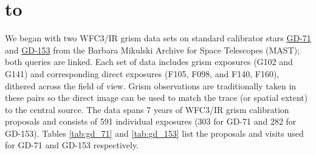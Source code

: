 \documentclass[12pt]{article}
\def\ssectionstar#1{\section*{\hbox to \hsize{\large\bf #1\hfill}}}
\begin{document}
{\ssectionstar{Data}
\normalsize{

    We began with two WFC3/IR grism data sets on standard calibrator stars
    \href{http://archive.stsci.edu/hst/search.php?action=Search&sci_instrume=WFC3&sci_targname=GD-71&sci_pep_id=11552,11926,11936,12333,12357,12702,13092,13579,14024,14386&sci_aper_1234=IR,G*}{
        \color{blue} GD-71} and
    \href{http://archive.stsci.edu/hst/search.php?action=Search&sci_instrume=WFC3&sci_targname=GD-153&sci_pep_id=11552,11926,11936,12333,12357,12702,13092,13579,14024,14386&sci_aper_1234=IR,G*}{
        \color{blue} GD-153} from the 
Barbara Mikulski Archive for Space Telescopes (MAST); both queries are linked. Each set of 
data includes grism exposures (G102 and G141) and corresponding direct exposures (F105, F098, and F140, F160), 
dithered across the field of view. Grism observations are traditionally taken
in these pairs so the direct image can be used to match the trace (or spatial
extent) to the central source. The data spans 7 years of WFC3/IR grism calibration proposals and consists of 
591 individual exposures (303 for GD-71 and 282 for GD-153). Tables \ref{tab:gd_71} and \ref{tab:gd_153} list the proposals and visits
used for GD-71 and GD-153 respectively. 

}}
\end{document}
